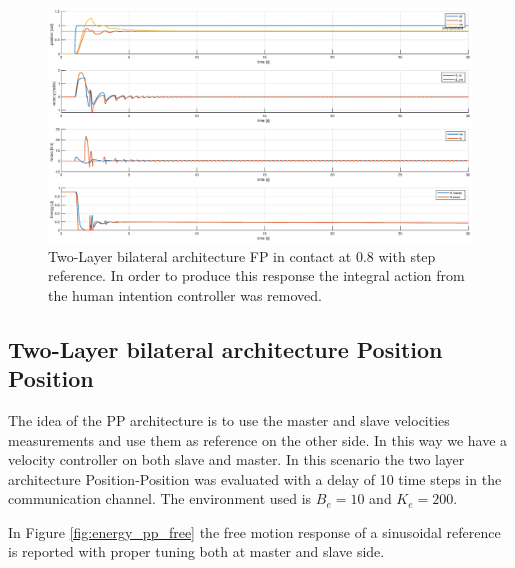 \documentclass[a4paper,12pt]{article}
\begin{document}
\begin{figure}[H]
    \begin{center}
        \hspace*{-4.5cm}
        \includegraphics[scale=0.5]{images/energy_pf_step.eps}
    \end{center}
    \caption{Two-Layer bilateral architecture FP in contact at 0.8 with step reference. In order to produce this response the integral action from the human intention controller was removed.}
    \label{fig:energy_pf_step}
\end{figure}

\newpage
\subsection{Two-Layer bilateral architecture Position Position}
The idea of the PP architecture is to use the master and slave velocities measurements and use them as reference on the other side. In this way we have a velocity controller on both slave and master. In this scenario the two layer architecture Position-Position was evaluated with a delay of 10 time steps in the communication channel. The environment used is $B_e = 10$ and $K_e = 200$. 

\bigskip
In Figure \ref{fig:energy_pp_free} the free motion response of a sinusoidal reference is reported with proper tuning both at master and slave side.
\end{document}

